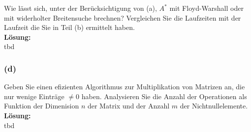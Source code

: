 \documentclass[11pt,a4paper,ngerman]{article}
\begin{document}
Wie lässt sich, unter der Berücksichtigung von (a), $A^*$ mit Floyd-Warshall oder mit widerholter Breitensuche brechnen?
Vergleichen Sie die Laufzeiten mit der Laufzeit die Sie in Teil (b) ermittelt haben.\\

\textbf{Lösung:}\\

tbd

\subsubsection*{(d)}

Geben Sie einen efizienten Algorithmus zur Multiplikation von Matrizen an, die nur wenige Einträge $\not= 0$ haben. Analysieren Sie die Anzahl der Operationen
als Funktion der Dimenision $n$ der Matrix und der Anzahl $m$ der Nichtnullelemente.\\

\textbf{Lösung:}\\

tbd

\label{LastPage}
\end{document}
